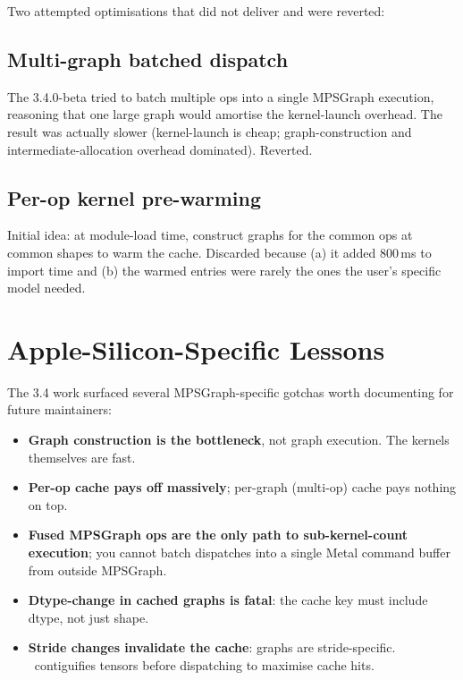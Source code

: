 Two attempted optimisations that did not deliver and were
reverted:

\subsection{Multi-graph batched dispatch}
\label{ssec:mpsgraph_dispatch:multi_graph}

The 3.4.0-beta tried to batch multiple ops into a single
MPSGraph execution, reasoning that one large graph would
amortise the kernel-launch overhead. The result was actually
slower (kernel-launch is cheap; graph-construction and
intermediate-allocation overhead dominated). Reverted.

\subsection{Per-op kernel pre-warming}
\label{ssec:mpsgraph_dispatch:pre_warming}

Initial idea: at module-load time, construct graphs for the
common ops at common shapes to warm the cache. Discarded
because (a) it added 800\,ms to import time and (b) the
warmed entries were rarely the ones the user's specific
model needed.

\section{Apple-Silicon-Specific Lessons}
\label{sec:mpsgraph_dispatch:apple_lessons}

The 3.4 work surfaced several MPSGraph-specific gotchas worth
documenting for future maintainers:

\begin{itemize}
  \item \textbf{Graph construction is the bottleneck},
    not graph execution. The kernels themselves are fast.
  \item \textbf{Per-op cache pays off massively}; per-graph
    (multi-op) cache pays nothing on top.
  \item \textbf{Fused MPSGraph ops are the only path to
    sub-kernel-count execution}; you cannot batch dispatches
    into a single Metal command buffer from outside MPSGraph.
  \item \textbf{Dtype-change in cached graphs is fatal}: the
    cache key must include dtype, not just shape.
  \item \textbf{Stride changes invalidate the cache}: graphs
    are stride-specific. \Lucid\ contiguifies tensors before
    dispatching to maximise cache hits.
\end{itemize}

